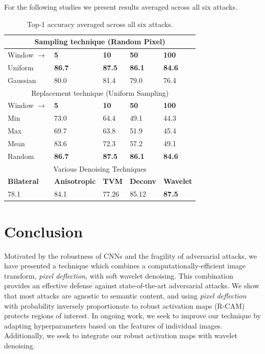For the following studies we present results averaged across all six attacks.

\begin{table}[]
\centering
{}
\begin{tabular}{lllll} \hline
\multicolumn{5}{c}{Sampling technique (Random Pixel)} \\ \hline
Window $\longrightarrow$   & \textbf{5} & \textbf{10} & \textbf{50} & \textbf{100} \\ \hline
Uniform  & \textbf{86.7}          & \textbf{87.5}          & \textbf{86.1}           & \textbf{84.6}           \\
Gaussian & 80.0          & 81.4          & 79.0           & 76.4          \\ \hline
\multicolumn{5}{c}{Replacement technique (Uniform Sampling)} \\ \hline
Window $\longrightarrow$   & \textbf{5} & \textbf{10} & \textbf{50} & \textbf{100} \\ \hline
Min & 73.0          & 64.4          & 49.1           & 44.3          \\
Max & 69.7          & 63.8          & 51.9           & 45.4          \\ 
Mean & 83.6         & 72.3         & 57.2           & 49.1          \\
Random & \textbf{86.7}       & \textbf{87.5}         & \textbf{86.1}           & \textbf{84.6}         \\ \hline
\multicolumn{5}{c}{Various Denoising Techniques} \\ \hline
\textbf{Bilateral} & \textbf{Anisotropic} & \textbf{TVM} & \textbf{Deconv} & \textbf{Wavelet} \\ \hline
78.1     & 84.1        & 77.26           & 85.12  & \textbf{87.5  } 

\end{tabular}
\caption[Average Accuracy of atacks]{Top-1 accuracy averaged across all six attacks.}
\end{table}


\section{Conclusion}
Motivated by the robustness of CNNs and the fragility of adversarial attacks, we have presented a technique which combines a computationally-efficient image transform, \emph{pixel deflection}, with soft wavelet denoising. 
This combination provides an effective defense against state-of-the-art adversarial attacks. 
We show that most attacks are agnostic to semantic content, and using \emph{pixel deflection} with probability inversely proportionate to robust activation maps (R-CAM) protects regions of interest.
In ongoing work, we seek to improve our technique by adapting hyperparameters based on the features of individual images. Additionally, we seek to integrate our robust activation maps with wavelet denoising.
